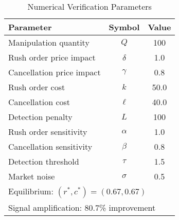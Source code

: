 \documentclass[12pt]{article}
\begin{document}
\begin{table}[htbp]
\centering
\caption{Numerical Verification Parameters}
\label{tab:num-verif-params}
\begin{tabular}{lcc}
\hline
Parameter & Symbol & Value \\
\hline
Manipulation quantity & $Q$ & 100 \\
Rush order price impact & $\delta$ & 1.0 \\
Cancellation price impact & $\gamma$ & 0.8 \\
Rush order cost & $k$ & 50.0 \\
Cancellation cost & $\ell$ & 40.0 \\
Detection penalty & $L$ & 100 \\
Rush order sensitivity & $\alpha$ & 1.0 \\
Cancellation sensitivity & $\beta$ & 0.8 \\
Detection threshold & $\tau$ & 1.5 \\
Market noise & $\sigma$ & 0.5 \\
\hline
\multicolumn{3}{l}{\footnotesize Equilibrium: $(r^*, c^*) = (0.67, 0.67)$} \\
\multicolumn{3}{l}{\footnotesize Signal amplification: 80.7\% improvement} \\
\hline
\end{tabular}
\end{table}
\end{document}
